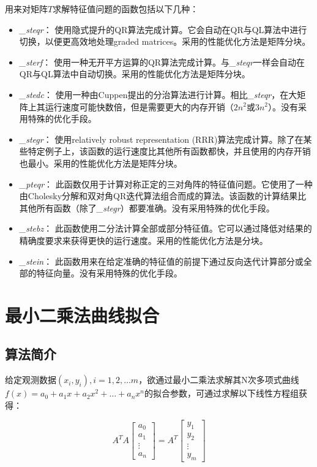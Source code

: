 \documentclass[a4paper]{article}
\begin{document}
用来对矩阵$T$求解特征值问题的函数包括以下几种：
\begin{itemize}
  \item \emph{\_steqr}： 使用隐式提升的QR算法完成计算。它会自动在QR与QL算法中进行切换，以便更高效地处理graded matrices。采用的性能优化方法是矩阵分块。
  \item \emph{\_sterf}： 使用一种无开平方运算的QR算法完成计算。与\emph{\_steqr}一样会自动在QR与QL算法中自动切换。采用的性能优化方法是矩阵分块。
  \item \emph{\_stedc}： 使用一种由Cuppen提出的分治算法进行计算。相比\emph{\_steqr}，在大矩阵上其运行速度可能快数倍，但是需要更大的内存开销（$2n^2$或$3n^2$）。没有采用特殊的优化手段。
  \item \emph{\_stegr}： 使用relatively robust representation (RRR)算法完成计算。除了在某些特定例子上，该函数的运行速度比其他所有函数都快，并且使用的内存开销也最小。采用的性能优化方法是矩阵分块。
  \item \emph{\_pteqr}： 此函数仅用于计算对称正定的三对角阵的特征值问题。它使用了一种由Cholesky分解和双对角QR迭代算法组合而成的算法。该函数的计算结果比其他所有函数（除了\emph{\_stegr}）都要准确。没有采用特殊的优化手段。
  \item \emph{\_stebz}： 此函数使用二分法计算全部或部分特征值。它可以通过降低对结果的精确度要求来获得更快的运行速度。采用的性能优化方法是分块。
  \item \emph{\_stein}： 此函数用来在给定准确的特征值的前提下通过反向迭代计算部分或全部的特征向量。没有采用特殊的优化手段。
\end{itemize}

\section{最小二乘法曲线拟合}
\subsection{算法简介}
给定观测数据$(x_i, y_i), i=1, 2, \dots m$，欲通过最小二乘法求解其N次多项式曲线$f(x)=a_0+a_1x+a_2x^2+\dots+a_nx^n$的拟合参数，可通过求解以下线性方程组获得：

\begin{equation*}
  A^TA
  \begin{bmatrix}
    a_0 \\
    a_1 \\
    \vdots \\
    a_n
  \end{bmatrix}
  =A^T
  \begin{bmatrix}
    y_1 \\
    y_2 \\
    \vdots \\
    y_m
  \end{bmatrix}
\end{equation*}
\end{document}
